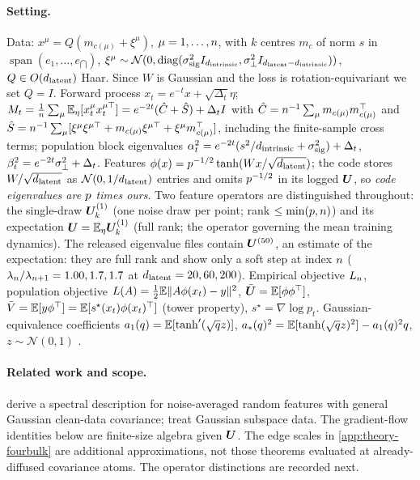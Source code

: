 \paragraph{Setting.}
Data: $x^\mu=Q(m_{c(\mu)}+\xi^\mu)$, $\mu=1,\dots,n$, with $k$ centres $m_c$ of norm $s$ in $\operatorname{span}(e_1,\dots,e_{\dint})$, $\xi^\mu\sim\mathcal N(0,\operatorname{diag}(\sigma_{\mathrm{sig}}^2I_{d_{\mathrm{intrinsic}}},\sigma_{\perp}^2I_{d_{\mathrm{latent}}-d_{\mathrm{intrinsic}}}))$, $Q\in O(d_{\mathrm{latent}})$ Haar. Since $W$ is Gaussian and the loss is rotation-equivariant we set $Q=I$. Forward process $x_t=e^{-t}x+\sqrt{\Delta_t}\eta$; $M_t=\tfrac1{n}\sum_\mu\mathbb{E}_\eta[x_t^\mu x_t^{\mu\top}]=e^{-2t}(\hat C+\hat S)+\Delta_tI$ with $\hat C=n^{-1}\sum_\mu m_{c(\mu)}m_{c(\mu)}^\top$ and $\hat S=n^{-1}\sum_\mu[\xi^\mu\xi^{\mu\top}+m_{c(\mu)}\xi^{\mu\top}+\xi^\mu m_{c(\mu)}^\top]$, including the finite-sample cross terms; population block eigenvalues $\alpha_t^2=e^{-2t}(s^2/d_{\mathrm{intrinsic}}+\sigma_{\mathrm{sig}}^2)+\Delta_t$, $\beta_t^2=e^{-2t}\sigma_{\perp}^2+\Delta_t$. Features $\phi(x)=p^{-1/2}\tanh(Wx/\sqrt{d_{\mathrm{latent}}})$; the code stores $W/\sqrt{d_{\mathrm{latent}}}$ as $\mathcal N(0,1/d_{\mathrm{latent}})$ entries and omits $p^{-1/2}$ in its logged $\bm{U}$, so \emph{code eigenvalues are $p$ times ours}. Two feature operators are distinguished throughout: the single-draw $\bm{U}^{(1)}_k$ (one noise draw per point; rank $\le\min(p,n)$) and its expectation $\bm{U}=\mathbb{E}_\eta\bm{U}^{(1)}_k$ (full rank; the operator governing the mean training dynamics). The released eigenvalue files contain $\bm{U}^{(50)}$, an estimate of the expectation: they are full rank and show only a soft step at index $n$ ($\lambda_{n}/\lambda_{n+1}=1.00,1.7,1.7$ at $d_{\mathrm{latent}}=20,60,200$). Empirical objective $L_{n}$, population objective $L(A)=\tfrac12\mathbb{E}\|A\phi(x_t)-y\|^2$, $\bar{\bm{U}}=\mathbb{E}[\phi\phi^{\top}]$, $\bar V=\mathbb{E}[y\phi^{\top}]=\mathbb{E}[s^\star(x_t)\phi(x_t)^{\top}]$ (tower property), $s^\star=\nabla\log p_t$. Gaussian-equivalence coefficients $a_1(q)=\mathbb{E}[\tanh'(\sqrt qz)]$, $a_*(q)^2=\mathbb{E}[\tanh(\sqrt qz)^2]-a_1(q)^2q$, $z\sim\mathcal N(0,1)$ \citep{pennington2017nonlinear,benigni2021eigenvalue,goldt2022gaussian,hu2022universality,mei2022generalization}.

\paragraph{Related work and scope.}
\citet{bonnaire2025} derive a spectral description for noise-averaged random features with general Gaussian clean-data covariance; \citet{george2025dsm} treat Gaussian subspace data. The gradient-flow identities below are finite-size algebra given $\bm{U}$. The edge scales in \cref{app:theory-fourbulk} are additional approximations, not those theorems evaluated at already-diffused covariance atoms. The operator distinctions are recorded next.

